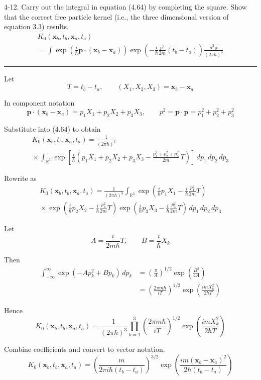 \documentclass[12pt]{article}
\newcommand\INT{\int_{\mathbb R^3}}
\begin{document}
4-12.
Carry out the integral in equation (4.64) by completing the square.
Show that the correct free particle kernel
(i.e., the three dimensional version of equation 3.3) results.
\begin{multline*}
K_0(\mathbf x_b,t_b,\mathbf x_a,t_a)
\\
=\int
\exp\left(\frac{i}{\hbar}\mathbf p\cdot(\mathbf x_b-\mathbf x_a)\right)
\exp\left(-\frac{i}{\hbar}\frac{p^2}{2m}(t_b-t_a)\right)
\frac{d^3\mathbf p}{(2\pi\hbar)^3}
\tag{4.64}
\end{multline*}

\bigskip
\hrule

\bigskip
Let
\begin{equation*}
T=t_b-t_a,
\qquad
(X_1,X_2,X_3)=\mathbf x_b-\mathbf x_a
\end{equation*}

In component notation
\begin{equation*}
\mathbf p\cdot(\mathbf x_b-\mathbf x_a)=p_1X_1+p_2X_2+p_3X_3,
\qquad
p^2=\mathbf p\cdot\mathbf p=p_1^2+p_2^2+p_3^2
\end{equation*}

Substitute into (4.64) to obtain
\begin{multline*}
K_0(\mathbf x_b,t_b,\mathbf x_a,t_a)=\frac{1}{(2\pi\hbar)^3}
\\
{}\times\INT
\exp\left[\frac{i}{\hbar}\left(
p_1X_1+p_2X_2+p_3X_3-\frac{p_1^2+p_2^2+p_3^2}{2m}\,T
\right)\right]
\,dp_1\,dp_2\,dp_3
\end{multline*}

Rewrite as
\begin{multline*}
K_0(\mathbf x_b,t_b,\mathbf x_a,t_a)=\frac{1}{(2\pi\hbar)^3}\INT
\exp\left(\frac{i}{\hbar}p_1X_1-\frac{i}{\hbar}\frac{p_1^2}{2m}T\right)
\\
{}\times
\exp\left(\frac{i}{\hbar}p_2X_2-\frac{i}{\hbar}\frac{p_2^2}{2m}T\right)
\exp\left(\frac{i}{\hbar}p_3X_3-\frac{i}{\hbar}\frac{p_3^2}{2m}T\right)
\,dp_1\,dp_2\,dp_3
\end{multline*}

Let
\begin{equation*}
A=\frac{i}{2m\hbar}T,
\qquad
B=\frac{i}{\hbar}X_k
\end{equation*}

Then
\begin{align*}
\int_{-\infty}^\infty\exp(-Ap_k^2+Bp_k)\,dp_k
&=\left(\frac{\pi}{A}\right)^{1/2}\exp\left(\frac{B^2}{4A}\right)
\\
&=\left(\frac{2\pi m\hbar}{iT}\right)^{1/2}
\exp\left(\frac{imX_k^2}{2\hbar T}\right)
\tag{1}
\end{align*}

Hence
\begin{equation*}
K_0(\mathbf x_b,t_b,\mathbf x_a,t_a)=
\frac{1}{(2\pi\hbar)^3}
\prod_{k=1}^3
\left(\frac{2\pi m\hbar}{iT}\right)^{1/2}
\exp\left(\frac{imX_k^2}{2\hbar T}\right)
\end{equation*}

Combine coefficients and convert to vector notation.
\begin{equation*}
K_0(\mathbf x_b,t_b,\mathbf x_a,t_a)=
\left(\frac{m}{2\pi i\hbar(t_b-t_a)}\right)^{3/2}
\exp\left(\frac{im(\mathbf x_b-\mathbf x_a)^2}{2\hbar(t_b-t_a)}\right)
\tag{2}
\end{equation*}
\end{document}
